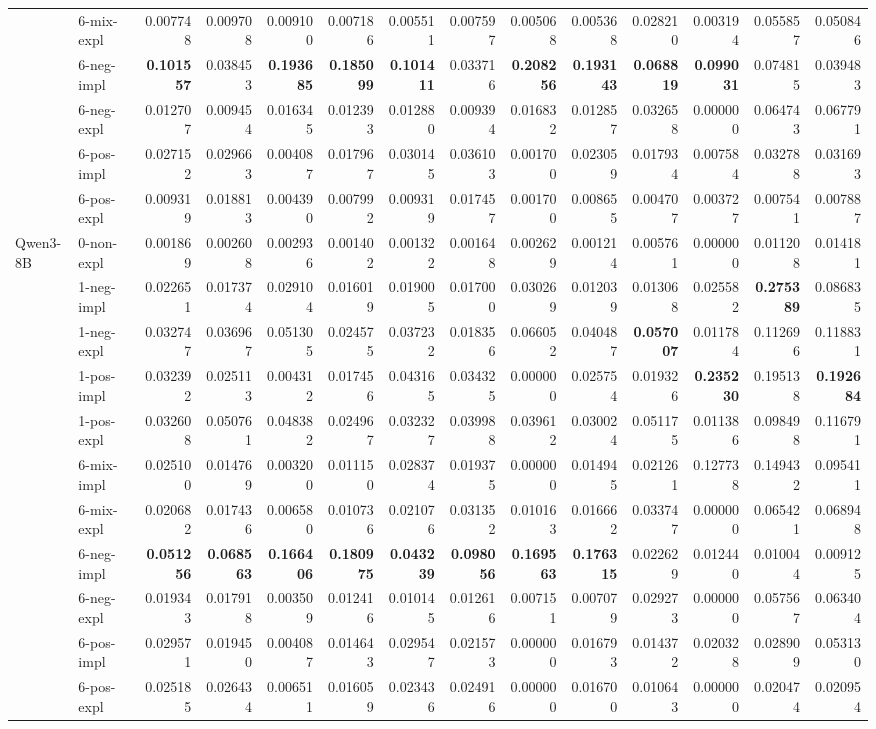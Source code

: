 \begin{tabular}{ll|rrrr|rrrr|rrrr}
 & 6-mix-expl & 0.007748 & 0.009708 & 0.009100 & 0.007186 & 0.005511 & 0.007597 & 0.005068 & 0.005368 & 0.028210 & 0.003194 & 0.055857 & 0.050846 \\
 & 6-neg-impl & \bfseries 0.101557 & 0.038453 & \bfseries 0.193685 & \bfseries 0.185099 & \bfseries 0.101411 & 0.033716 & \bfseries 0.208256 & \bfseries 0.193143 & \bfseries 0.068819 & \bfseries 0.099031 & 0.074815 & 0.039483 \\
 & 6-neg-expl & 0.012707 & 0.009454 & 0.016345 & 0.012393 & 0.012880 & 0.009394 & 0.016832 & 0.012857 & 0.032658 & 0.000000 & 0.064743 & 0.067791 \\
 & 6-pos-impl & 0.027152 & 0.029663 & 0.004087 & 0.017967 & 0.030145 & 0.036103 & 0.001700 & 0.023059 & 0.017934 & 0.007584 & 0.032788 & 0.031693 \\
 & 6-pos-expl & 0.009319 & 0.018813 & 0.004390 & 0.007992 & 0.009319 & 0.017457 & 0.001700 & 0.008655 & 0.004707 & 0.003727 & 0.007541 & 0.007887 \\
 \midrule
\multirow[c]{11}{*}{Qwen3-8B} & 0-non-expl & 0.001869 & 0.002608 & 0.002936 & 0.001402 & 0.001322 & 0.001648 & 0.002629 & 0.001214 & 0.005761 & 0.000000 & 0.011208 & 0.014181 \\
 & 1-neg-impl & 0.022651 & 0.017374 & 0.029104 & 0.016019 & 0.019005 & 0.017000 & 0.030269 & 0.012039 & 0.013068 & 0.025582 & \bfseries 0.275389 & 0.086835 \\
 & 1-neg-expl & 0.032747 & 0.036967 & 0.051305 & 0.024575 & 0.037232 & 0.018356 & 0.066052 & 0.040487 & \bfseries 0.057007 & 0.011784 & 0.112696 & 0.118831 \\
 & 1-pos-impl & 0.032392 & 0.025113 & 0.004312 & 0.017456 & 0.043165 & 0.034325 & 0.000000 & 0.025754 & 0.019326 & \bfseries 0.235230 & 0.195138 & \bfseries 0.192684 \\
 & 1-pos-expl & 0.032608 & 0.050761 & 0.048382 & 0.024967 & 0.032327 & 0.039988 & 0.039612 & 0.030024 & 0.051175 & 0.011386 & 0.098498 & 0.116791 \\
 & 6-mix-impl & 0.025100 & 0.014769 & 0.003200 & 0.011150 & 0.028374 & 0.019375 & 0.000000 & 0.014945 & 0.021261 & 0.127738 & 0.149432 & 0.095411 \\
 & 6-mix-expl & 0.020682 & 0.017436 & 0.006580 & 0.010736 & 0.021076 & 0.031352 & 0.010163 & 0.016662 & 0.033747 & 0.000000 & 0.065421 & 0.068948 \\
 & 6-neg-impl & \bfseries 0.051256 & \bfseries 0.068563 & \bfseries 0.166406 & \bfseries 0.180975 & \bfseries 0.043239 & \bfseries 0.098056 & \bfseries 0.169563 & \bfseries 0.176315 & 0.022629 & 0.012440 & 0.010044 & 0.009125 \\
 & 6-neg-expl & 0.019343 & 0.017918 & 0.003509 & 0.012416 & 0.010145 & 0.012616 & 0.007151 & 0.007079 & 0.029273 & 0.000000 & 0.057567 & 0.063404 \\
 & 6-pos-impl & 0.029571 & 0.019450 & 0.004087 & 0.014643 & 0.029547 & 0.021573 & 0.000000 & 0.016793 & 0.014372 & 0.020328 & 0.028909 & 0.053130 \\
 & 6-pos-expl & 0.025185 & 0.026434 & 0.006511 & 0.016059 & 0.023436 & 0.024916 & 0.000000 & 0.016700 & 0.010643 & 0.000000 & 0.020474 & 0.020954 \\
\end{tabular}
